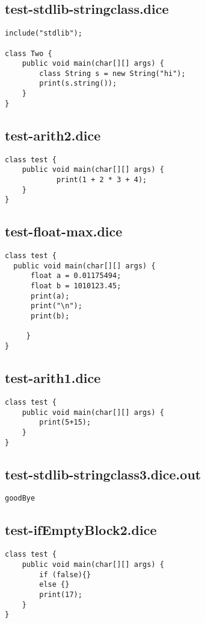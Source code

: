 \subsection{test-stdlib-stringclass.dice}
\begin{verbatim}
include("stdlib");

class Two {
	public void main(char[][] args) {
        class String s = new String("hi");
        print(s.string());
	}
}

\end{verbatim}
\pagebreak
\subsection{test-arith2.dice}
\begin{verbatim}
class test {
	public void main(char[][] args) {
			print(1 + 2 * 3 + 4);
	}
} 

\end{verbatim}
\pagebreak
\subsection{test-float-max.dice}
\begin{verbatim}
class test {
  public void main(char[][] args) {
      float a = 0.01175494;
      float b = 1010123.45;
      print(a);
      print("\n");
      print(b);

     }
}
\end{verbatim}
\pagebreak
\subsection{test-arith1.dice}
\begin{verbatim}
class test {
	public void main(char[][] args) {
		print(5+15);
	}
}
\end{verbatim}
\pagebreak
\subsection{test-stdlib-stringclass3.dice.out}
\begin{verbatim}
goodBye
\end{verbatim}
\pagebreak
\subsection{test-ifEmptyBlock2.dice}
\begin{verbatim}
class test {
	public void main(char[][] args) {
  		if (false){}
  		else {}
  		print(17);
	}
}

\end{verbatim}
\pagebreak
